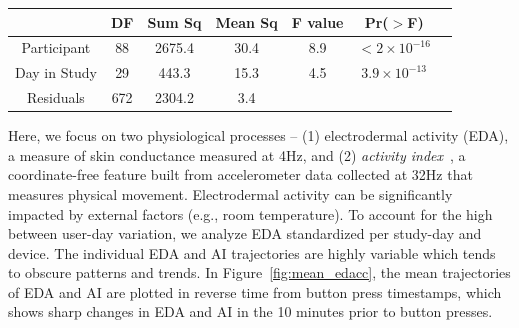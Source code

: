 \documentclass[12pt]{amsart}
\begin{document}
\begin{table}[!th]
\begin{tabular}{ccccccc}\hline
      & DF & Sum Sq & Mean Sq & F value & Pr($>$F) \\ \hline
        Participant & 88 & 2675.4 & 30.4 & 8.9 & $< 2 \times 10^{-16}$ \\
        Day in Study & 29 & 443.3 & 15.3 & 4.5 & $3.9 \times 10^{-13}$ \\
        Residuals & 672 & 2304.2 & 3.4 \\ \hline
      \end{tabular}  
      \label{tab:anova}
\end{table}

Here, we focus on two physiological processes -- (1) electrodermal activity (EDA), a measure of skin conductance measured at 4Hz, and  (2) \emph{activity index}~\citep{10.1371/journal.pone.0160644}, a coordinate-free feature built from accelerometer data collected at 32Hz that measures physical movement.  Electrodermal activity can be significantly impacted by external factors (e.g., room temperature).  To account for the high between user-day variation, we analyze EDA standardized per study-day and  device. The individual EDA and AI trajectories are highly variable which tends to obscure patterns and trends.  In Figure~\ref{fig:mean_edacc}, the mean trajectories of EDA and AI are plotted in reverse time from button press timestamps, which shows sharp changes in EDA and AI in the 10 minutes prior to button presses.
\end{document}
